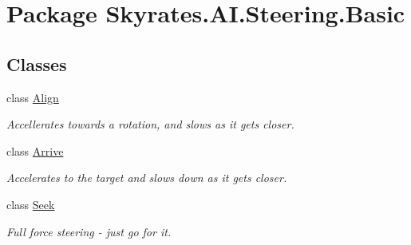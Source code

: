 \hypertarget{namespace_skyrates_1_1_a_i_1_1_steering_1_1_basic}{\section{Package Skyrates.\-A\-I.\-Steering.\-Basic}
\label{namespace_skyrates_1_1_a_i_1_1_steering_1_1_basic}
}
\subsection*{Classes}
\begin{DoxyCompactItemize}
\item 
class \hyperlink{class_skyrates_1_1_a_i_1_1_steering_1_1_basic_1_1_align}{Align}
\begin{DoxyCompactList}\small\item\em Accellerates towards a rotation, and slows as it gets closer. \end{DoxyCompactList}\item 
class \hyperlink{class_skyrates_1_1_a_i_1_1_steering_1_1_basic_1_1_arrive}{Arrive}
\begin{DoxyCompactList}\small\item\em Accelerates to the target and slows down as it gets closer. \end{DoxyCompactList}\item 
class \hyperlink{class_skyrates_1_1_a_i_1_1_steering_1_1_basic_1_1_seek}{Seek}
\begin{DoxyCompactList}\small\item\em Full force steering -\/ just go for it. \end{DoxyCompactList}\end{DoxyCompactItemize}
